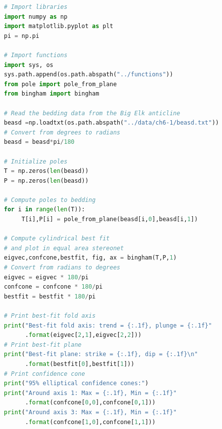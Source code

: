 \documentclass[a4paper , 12pt]{book}
\begin{document}
\begin{center}
\begin{lstlisting}[language=Python, frame=single]
# Import libraries
import numpy as np
import matplotlib.pyplot as plt
pi = np.pi

# Import functions 
import sys, os
sys.path.append(os.path.abspath("../functions"))
from pole import pole_from_plane
from bingham import bingham

# Read the bedding data from the Big Elk anticline
beasd =np.loadtxt(os.path.abspath("../data/ch6-1/beasd.txt"))
# Convert from degrees to radians
beasd = beasd*pi/180

# Initialize poles
T = np.zeros(len(beasd))
P = np.zeros(len(beasd))

# Compute poles to bedding
for i in range(len(T)):
     T[i],P[i] = pole_from_plane(beasd[i,0],beasd[i,1])

# Compute cylindrical best fit
# and plot in equal area stereonet
eigvec,confcone,bestfit, fig, ax = bingham(T,P,1)
# Convert from radians to degrees
eigvec = eigvec * 180/pi
confcone = confcone * 180/pi
bestfit = bestfit * 180/pi

# Print best-fit fold axis
print("Best-fit fold axis: trend = {:.1f}, plunge = {:.1f}"
      .format(eigvec[2,1],eigvec[2,2]))
# Print best-fit plane 
print("Best-fit plane: strike = {:.1f}, dip = {:.1f}\n"
      .format(bestfit[0],bestfit[1]))
# Print confidence cone
print("95% elliptical confidence cones:")
print("Around axis 1: Max = {:.1f}, Min = {:.1f}"
      .format(confcone[0,0],confcone[0,1]))
print("Around axis 3: Max = {:.1f}, Min = {:.1f}"
      .format(confcone[1,0],confcone[1,1]))
\end{lstlisting}
\end{center}
\end{document}
